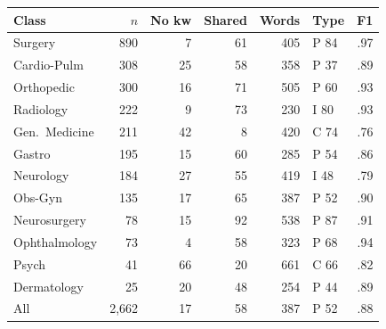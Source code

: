 \documentclass[twocolumn,10pt]{article}
\begin{document}
\noindent\begin{minipage}{\columnwidth}\centering
\footnotesize
\setlength{\tabcolsep}{4pt}
\label{tab:classes}
\begin{tabular}{@{}lrrrrlr@{}}
\toprule
Class          & $n$   & No kw & Shared & Words & Type & F1 \\
\midrule
Surgery        & 890   &  7 & 61 & 405 & P 84 & .97 \\
Cardio-Pulm    & 308   & 25 & 58 & 358 & P 37 & .89 \\
Orthopedic     & 300   & 16 & 71 & 505 & P 60 & .93 \\
Radiology      & 222   &  9 & 73 & 230 & I 80 & .93 \\
Gen.\ Medicine & 211   & 42 &  8 & 420 & C 74 & .76 \\
Gastro         & 195   & 15 & 60 & 285 & P 54 & .86 \\
Neurology      & 184   & 27 & 55 & 419 & I 48 & .79 \\
Obs-Gyn        & 135   & 17 & 65 & 387 & P 52 & .90 \\
Neurosurgery   &  78   & 15 & 92 & 538 & P 87 & .91 \\
Ophthalmology  &  73   &  4 & 58 & 323 & P 68 & .94 \\
Psych          &  41   & 66 & 20 & 661 & C 66 & .82 \\
Dermatology    &  25   & 20 & 48 & 254 & P 44 & .89 \\
\midrule
All            & 2,662 & 17 & 58 & 387 & P 52 & .88 \\
\bottomrule
\end{tabular}
\end{minipage}\par\medskip
\end{document}
